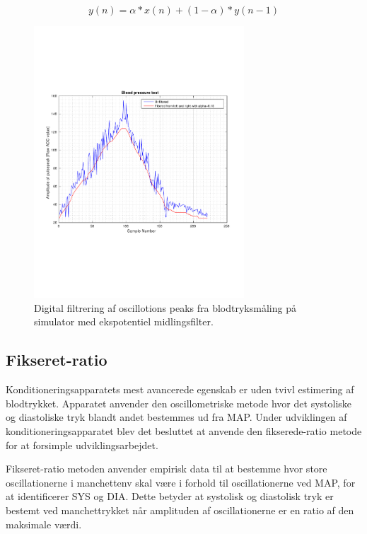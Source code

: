 \begin{equation}
y(n)=\alpha*x(n)+(1-\alpha)*y(n-1)
\label{eq:ekspotentielmidlingsfilter}
\end{equation}
\begin{figure}[H]
	\centering
	\includegraphics[trim={0 0 0 0},clip, width=0.7\textwidth]{billeder/digitalFilterData.pdf}	
	\parbox{10.5cm}{\caption{Digital filtrering af oscillotions peaks fra blodtryksmåling på simulator med ekspotentiel midlingsfilter.}\label{fig:digitalFilterData}}
\end{figure}


\subsection{Fikseret-ratio} \label{Fikseret-ratio}
Konditioneringsapparatets mest avancerede egenskab er uden tvivl estimering af blodtrykket. Apparatet anvender den oscillometriske metode hvor det systoliske og diastoliske tryk blandt andet bestemmes ud fra MAP. Under udviklingen af konditioneringsapparatet blev det besluttet at anvende den fikserede-ratio metode for at forsimple udviklingsarbejdet.

Fikseret-ratio metoden anvender empirisk data til at bestemme hvor store oscillationerne i manchettenv skal være i forhold til oscillationerne ved MAP, for at identificerer SYS og DIA. Dette betyder at systolisk og diastolisk tryk er bestemt ved manchettrykket når amplituden af oscillationerne er en ratio af den maksimale værdi. 

